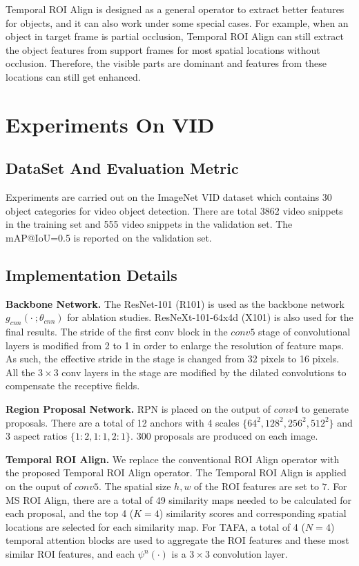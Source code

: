 \documentclass[letterpaper]{article} \usepackage{aaai21}  \usepackage{times}  \usepackage{helvet} \usepackage{courier}  \usepackage[hyphens]{url}  \usepackage{graphicx} \usepackage{hyperref}
\begin{document}
Temporal ROI Align is designed as a general operator to extract better features for objects, and it can also work under some special cases. For example, when an object in target frame is partial occlusion, Temporal ROI Align can still extract the object features from support frames for most spatial locations without occlusion. Therefore, the visible parts are dominant and features from these locations can still get enhanced. \section{Experiments On VID}


\subsection{DataSet And Evaluation Metric}
\label{exp_dataset}

Experiments are carried out on the ImageNet VID dataset \cite{russakovsky2015imagenet} which contains 30 object categories for video object detection.
There are total 3862 video snippets in the training set and 555 video snippets in the validation set. 
The mAP@IoU=0.5 is reported on the validation set.

\subsection{Implementation Details}
\label{exp_implement_details}

\noindent\textbf{Backbone Network.}
The ResNet-101 \cite{he2016deep} (R101) is used as the backbone network $g_{cnn}(\cdot\ ;\theta_{cnn})$ for ablation studies. ResNeXt-101-64x4d \cite{xie2017aggregated} (X101) is also used for the final results. The stride of the first conv block in the $conv5$ stage of convolutional layers is modified from 2 to 1 in order to enlarge the resolution of feature maps. As such, the effective stride in the stage is changed from 32 pixels to 16 pixels. All the $3\times 3$ conv layers in the stage are modified by the dilated convolutions to compensate the receptive fields.

\noindent\textbf{Region Proposal Network.}
RPN is placed on the output of $conv4$ to generate proposals. There are a total of 12 anchors with 4 scales $\{64^2, 128^2, 256^2, 512^2\}$ and 3 aspect ratios $\{1:2, 1:1, 2:1\}$. 300 proposals are produced on each image.

\noindent\textbf{Temporal ROI Align.}
We replace the conventional ROI Align operator with the proposed Temporal ROI Align operator. The Temporal ROI Align is applied on the ouput of $conv5$. The spatial size $h, w$ of the ROI features are set to $7$. For MS ROI Align, there are a total of 49 similarity maps needed to be calculated for each proposal, and the top 4 ($K=4$) similarity scores and corresponding spatial locations are selected for each similarity map. For TAFA, a total of 4 ($N=4$) temporal attention blocks are used to aggregate the ROI features and these most similar ROI features, and each $\psi^n(\cdot)$ is a $3\times 3$ convolution layer.
\end{document}
